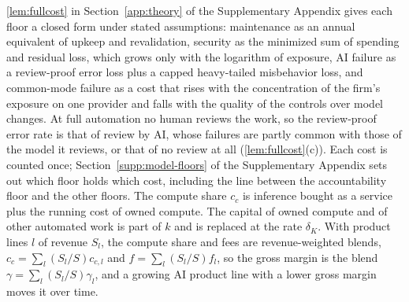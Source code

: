 \autoref{lem:fullcost} in Section~\ref{app:theory} of the Supplementary Appendix gives each floor a closed form under stated assumptions: maintenance as an annual equivalent of upkeep and revalidation, security as the minimized sum of spending and residual loss, which grows only with the logarithm of exposure, AI failure as a review-proof error loss plus a capped heavy-tailed misbehavior loss, and common-mode failure as a cost that rises with the concentration of the firm's exposure on one provider and falls with the quality of the controls over model changes. At full automation no human reviews the work, so the review-proof error rate is that of review by AI, whose failures are partly common with those of the model it reviews, or that of no review at all (\autoref{lem:fullcost}(c)). Each cost is counted once; Section~\ref{supp:model-floors} of the Supplementary Appendix sets out which floor holds which cost, including the line between the accountability floor and the other floors. The compute share $c_c$ is inference bought as a service plus the running cost of owned compute. The capital of owned compute and of other automated work is part of $k$ and is replaced at the rate $\delta_K$. With product lines $l$ of revenue $S_l$, the compute share and fees are revenue-weighted blends, $c_c=\sum_l(S_l/S)c_{c,l}$ and $f=\sum_l(S_l/S)f_l$, so the gross margin is the blend $\gamma=\sum_l(S_l/S)\gamma_l$, and a growing AI product line with a lower gross margin moves it over time.

